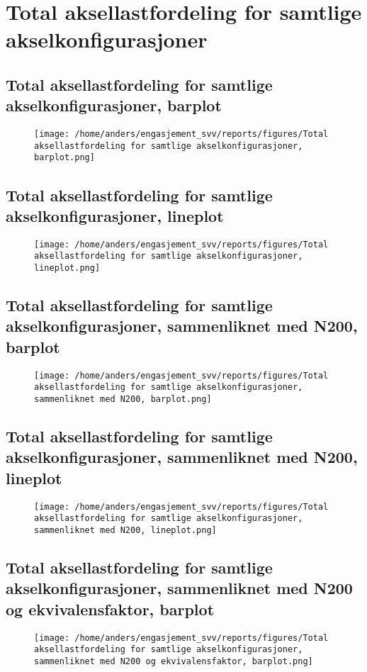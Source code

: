 \documentclass{article}
\begin{document}
\section{Total aksellastfordeling for samtlige akselkonfigurasjoner}
\subsection{Total aksellastfordeling for samtlige akselkonfigurasjoner, barplot}
\begin{figure}[H]
\centering
\texttt{[image: /home/anders/engasjement\_svv/reports/figures/Total aksellastfordeling for samtlige akselkonfigurasjoner, barplot.png]}
\end{figure}
\subsection{Total aksellastfordeling for samtlige akselkonfigurasjoner, lineplot}
\begin{figure}[H]
\centering
\texttt{[image: /home/anders/engasjement\_svv/reports/figures/Total aksellastfordeling for samtlige akselkonfigurasjoner, lineplot.png]}
\end{figure}
\subsection{Total aksellastfordeling for samtlige akselkonfigurasjoner, sammenliknet med N200, barplot}
\begin{figure}[H]
\centering
\texttt{[image: /home/anders/engasjement\_svv/reports/figures/Total aksellastfordeling for samtlige akselkonfigurasjoner, sammenliknet med N200, barplot.png]}
\end{figure}
\subsection{Total aksellastfordeling for samtlige akselkonfigurasjoner, sammenliknet med N200, lineplot}
\begin{figure}[H]
\centering
\texttt{[image: /home/anders/engasjement\_svv/reports/figures/Total aksellastfordeling for samtlige akselkonfigurasjoner, sammenliknet med N200, lineplot.png]}
\end{figure}
\subsection{Total aksellastfordeling for samtlige akselkonfigurasjoner, sammenliknet med N200 og ekvivalensfaktor, barplot}
\begin{figure}[H]
\centering
\texttt{[image: /home/anders/engasjement\_svv/reports/figures/Total aksellastfordeling for samtlige akselkonfigurasjoner, sammenliknet med N200 og ekvivalensfaktor, barplot.png]}
\end{figure}
\end{document}
